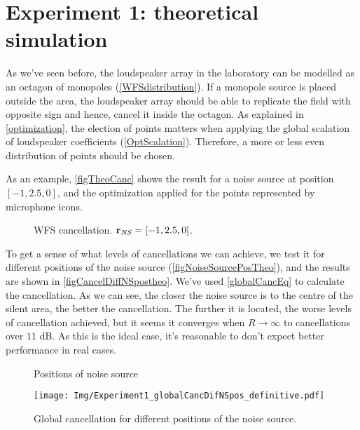 \section{Experiment 1: theoretical simulation}
As we've seen before, the loudspeaker array in the laboratory can be modelled as an octagon of monopoles (\autoref{WFSdistribution}). If a monopole source is placed outside the area, the loudspeaker array should be able to replicate the field with opposite sign and hence, cancel it inside the octagon. As explained in \autoref{optimization}, the election of points matters when applying the global scalation of loudspeaker coefficients (\autoref{OptScalation}). Therefore, a more or less even distribution of points should be chosen.

As an example, \autoref{figTheoCanc} shows the result for a noise source at position $[-1, 2.5, 0]$, and the optimization applied for the points represented by microphone icons.

\begin{figure}
	\centering
	\caption[WFS cancellation]{WFS cancellation. $\pos[vecNS]{} = [-1, 2.5, 0]$.}
	\label{figTheoCanc}
\end{figure}

To get a sense of what levels of cancellations we can achieve, we test it for different positions of the noise source (\autoref{figNoiseSourcePosTheo}), and the results are shown in \autoref{figCancelDiffNSpostheo}. We've used \autoref{globalCancEq} to calculate the cancellation. As we can see, the closer the noise source is to the centre of the silent area, the better the cancellation. The further it is located, the worse levels of cancellation achieved, but it seems it converges when $R\rightarrow\infty$ to cancellations over $11$ dB. As this is the ideal case, it's reasonable to don't expect better performance in real cases.

\begin{figure}[h]
	\centering
	\begin{minipage}[b]{0.49\textwidth}
			\centering
			\def\svgwidth{\columnwidth}
			\graphicspath{{Img/}}
			
			\caption[Positions of noise source]{Positions of noise source}
			\label{figNoiseSourcePosTheo}
	\end{minipage}
	\begin{minipage}[b]{0.49\textwidth}
			\centering
		\texttt{[image: Img/Experiment1\_globalCancDifNSpos\_definitive.pdf]}
		\caption[Global cancellation. Theoretical model.]{Global cancellation for different positions of the noise source.}
		\label{figCancelDiffNSpostheo}
	\end{minipage}
\end{figure}

